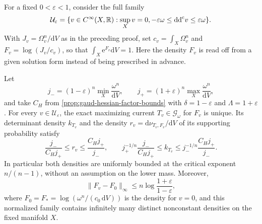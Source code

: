 For a fixed $0<\varepsilon<1$, consider the full family
\begin{equation}\label{eq:gaud-controlled-hessian-family}
 \mathcal U_\varepsilon=
 \{v\in C^\infty(X,\mathbb R):\sup_Xv=0,
                    -\varepsilon\omega\leq\mathrm{dd}^{\mathrm{c}} v\leq\varepsilon\omega\}.
\end{equation}
With $J_v=\Omega_v^n/\mathrm{d}V$ as in the preceding proof, set $c_v=\int_X\Omega_v^n$ and $F_v=\log(J_v/c_v)$, so that $\int_X\mathrm e^{F_v}\mathrm{d}V=1$. Here the density $F_v$ is read off from a given solution form instead of being prescribed in advance.

\begin{theorem}\label{thm:gaud-hessian-adjoint-endpoint}
Let
\[
 j_-=(1-\varepsilon)^n\min_X\frac{\omega^n}{\mathrm{d}V},
 \qquad j_+=(1+\varepsilon)^n\max_X\frac{\omega^n}{\mathrm{d}V},
\]
and take $C_H$ from \cref{prop:gaud-hessian-factor-bounds} with $\delta=1-\varepsilon$ and $\Lambda=1+\varepsilon$. For every $v\in\mathcal U_\varepsilon$, the exact maximizing current $T_v\in\mathscr G_\omega$ for $F_v$ is unique. Its determinant density $k_{T_v}$ and the density $r_v=\mathrm d\nu_{T_v,F_v}/\mathrm{d}V$ of its supporting probability satisfy
\begin{equation}\label{eq:gaud-hessian-adjoint-bounds}
 \frac{j_-}{C_Hj_+}\leq r_v\leq\frac{C_Hj_+}{j_-},
 \qquad
 j_+^{-1/n}\frac{j_-}{C_Hj_+}
 \leq k_{T_v}\leq j_-^{-1/n}\frac{C_Hj_+}{j_-}.
\end{equation}
In particular both densities are uniformly bounded at the critical exponent $n/(n-1)$, without an assumption on the lower mass. Moreover,
\[
 \|F_v-F_0\|_\infty
       \leq n\log\frac{1+\varepsilon}{1-\varepsilon},
\]
where $F_0=F_*=\log(\omega^n/(c_0\,\mathrm{d}V))$ is the density for $v=0$, and this normalized family contains infinitely many distinct nonconstant densities on the fixed manifold $X$.
\end{theorem}
